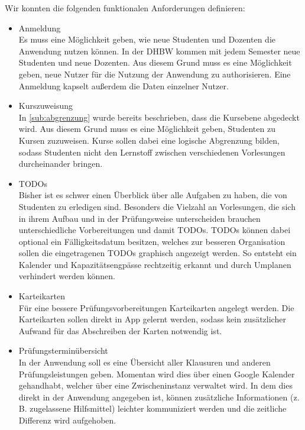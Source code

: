 Wir konnten die folgenden funktionalen Anforderungen definieren:
\begin{itemize}
    \item Anmeldung                         \\
        Es muss eine Möglichkeit geben, wie neue Studenten und Dozenten die Anwendung nutzen können.
        In der DHBW kommen mit jedem Semester neue Studenten und neue Dozenten.
        Aus diesem Grund muss es eine Möglichkeit geben, neue Nutzer für die Nutzung der Anwendung zu authorisieren.
        Eine Anmeldung kapselt außerdem die Daten einzelner Nutzer.
    \item Kurszuweisung                     \\
        In \autoref{sub:abgrenzung} wurde bereits beschrieben, dass die Kursebene abgedeckt wird.
        Aus diesem Grund muss es eine Möglichkeit geben, Studenten zu Kursen zuzuweisen.
        Kurse sollen dabei eine logische Abgrenzung bilden, sodass Studenten nicht den Lernstoff zwischen verschiedenen Vorlesungen durcheinander bringen.
    \item TODOs                             \\
        Bisher ist es schwer einen Überblick über alle Aufgaben zu haben, die von Studenten zu erledigen sind.
        Besonders die Vielzahl an Vorlesungen, die sich in ihrem Aufbau und in der Prüfungsweise unterscheiden brauchen unterschiedliche Vorbereitungen und damit TODOs.
        TODOs können dabei optional ein Fälligkeitsdatum besitzen, welches zur besseren Organisation sollen die eingetragenen TODOs graphisch angezeigt werden.
        So entsteht ein Kalender und Kapazitätsengpässe rechtzeitig erkannt und durch Umplanen verhindert werden können.

    \item Karteikarten                      \\
        Für eine bessere Prüfungsvorbereitungen Karteikarten angelegt werden.
        Die Karteikarten sollen direkt in App gelernt werden, sodass kein zusätzlicher Aufwand für das Abschreiben der Karten notwendig ist.

    \item Prüfungsterminübersicht           \\
        In der Anwendung soll es eine Übersicht aller Klausuren und anderen Prüfungsleistungen geben.
        Momentan wird dies über einen Google Kalender gehandhabt, welcher über eine Zwischeninstanz verwaltet wird.
        In dem dies direkt in der Anwendung angegeben ist, können zusätzliche Informationen (z.\,B. zugelassene Hilfsmittel) leichter kommuniziert werden und die zeitliche Differenz wird aufgehoben.


\end{itemize}

